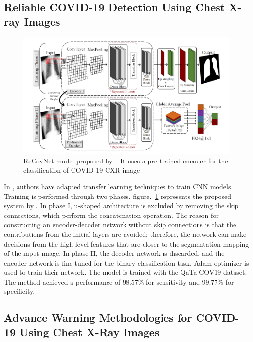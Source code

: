 \subsection{Reliable COVID-19 Detection Using Chest X-ray Images}
\begin{figure}
    \begin{center}
        \includegraphics[width=\textwidth]{Figures/RltDag.png}
        \caption{\label{rlt:dag} ReCovNet model proposed by~\cite{dag}. It uses a pre-trained encoder for the classification of COVID-19 CXR image}
    \end{center}
\end{figure}
In \cite{dag}, authors have adapted transfer learning techniques to train CNN models. Training is performed through two phases. figure.~\ref{rlt:dag} represents the proposed system by \cite{dag}. In phase I, u-shaped architecture is excluded by removing the skip connections, which perform the concatenation operation. The reason for constructing an encoder-decoder network without skip connections is that the contributions from the initial layers are avoided; therefore, the network can make decisions from the high-level features that are closer to the segmentation mapping of the input image.  In phase II, the decoder network is discarded, and the encoder network is fine-tuned for the binary classification task. Adam optimizer is used to train their network. The model is trained with the QaTa-COV19 dataset. The method achieved a performance of 98.57\% for sensitivity and 99.77\%  for specificity.

\subsection{Advance Warning Methodologies for
COVID-19 Using Chest X-Ray Images}

